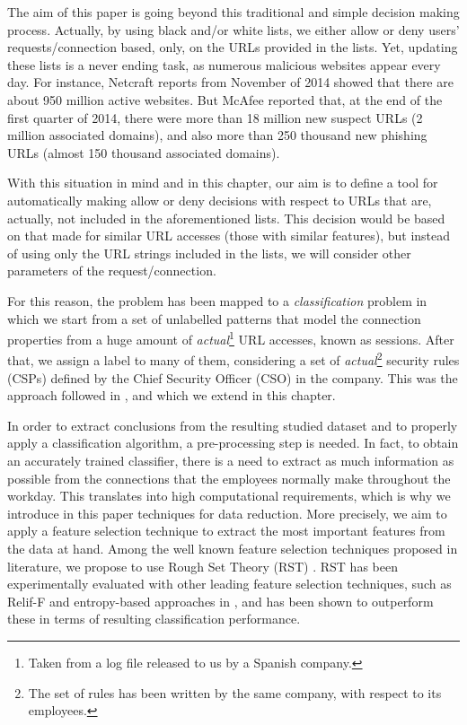 \documentclass{llncs}
\begin{document}
The aim of this paper is going beyond this traditional and simple decision making process. Actually, by using black 
and/or white lists, we either allow or deny users' requests/connection based, only, on the URLs provided in the lists. 
Yet, updating these lists is a never ending task, as numerous malicious websites appear every day. 
For instance, Netcraft reports from November of 2014 \cite{netcraft:site} showed that there are about 950 
million active websites. But McAfee reported \cite{mcafee:site} that, at the end of the first quarter of 2014, 
there were more than 18 million new suspect URLs (2 million associated domains), and also more than 250 thousand 
new phishing URLs (almost 150 thousand associated domains).

With this situation in mind and in this chapter, our aim is to define a tool for automatically making allow or 
deny decisions with respect to URLs that are, actually, not included in the aforementioned lists. This decision 
would be based on that made for similar URL accesses (those with similar features), but instead of using only 
the URL strings included in the lists, we will consider other parameters of the request/connection.

For this reason, the problem has been mapped to a \textit{classification} problem in which we start from a set of 
unlabelled patterns that model the connection properties from a huge amount of \textit{actual}\footnote{Taken from a 
log file released to   us by a  Spanish company.} URL accesses, known as sessions. After that, we assign a label to many 
of them, considering a set of \textit{actual}\footnote{The set of rules has been written by the same   company, with respect 
to its employees.} security rules (CSPs) defined by the Chief Security Officer (CSO) in the company. This was the approach 
followed in \cite{ECTA}, and which we extend in this chapter.

In order to extract conclusions from the resulting studied dataset and to properly apply a classification algorithm, 
a pre-processing step is needed. In fact, to obtain an accurately trained classifier, there is a need to extract as much 
information as possible from the connections
that the employees normally make throughout the workday. This translates into high computational requirements, which is 
why we introduce in this paper  techniques for data reduction. More precisely, we aim to apply a feature selection 
technique to extract the most important features from the data at hand. Among the well known feature selection techniques 
proposed in literature, we propose to use Rough Set Theory (RST) \cite{pawlak2008rough}. RST has been experimentally 
evaluated with other leading feature selection techniques, such as Relif-F and entropy-based approaches 
in \cite{jensen2007fuzzy}, and has been shown to outperform these in terms of resulting classification performance.
 
\end{document}
